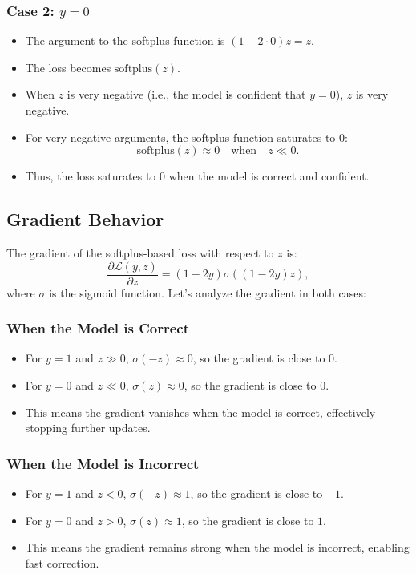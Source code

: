 \begin{notechapter}
\subsubsection{Case 2: \( y = 0 \)}
\begin{itemize}
    \item The argument to the softplus function is \( (1 - 2 \cdot 0)z = z \).
    \item The loss becomes \( \text{softplus}(z) \).
    \item When \( z \) is very negative (i.e., the model is confident that \( y = 0 \)), \( z \) is very negative.
    \item For very negative arguments, the softplus function saturates to 0:
          \[
          \text{softplus}(z) \approx 0 \quad \text{when} \quad z \ll 0.
          \]
    \item Thus, the loss saturates to 0 when the model is correct and confident.
\end{itemize}

\subsection{Gradient Behavior}
The gradient of the softplus-based loss with respect to \( z \) is:
\[
\frac{\partial \mathcal{L}(y, z)}{\partial z} = (1 - 2y) \sigma((1 - 2y)z),
\]
where \( \sigma \) is the sigmoid function. Let’s analyze the gradient in both cases:

\subsubsection{When the Model is Correct}
\begin{itemize}
    \item For \( y = 1 \) and \( z \gg 0 \), \( \sigma(-z) \approx 0 \), so the gradient is close to 0.
    \item For \( y = 0 \) and \( z \ll 0 \), \( \sigma(z) \approx 0 \), so the gradient is close to 0.
    \item This means the gradient vanishes when the model is correct, effectively stopping further updates.
\end{itemize}

\subsubsection{When the Model is Incorrect}
\begin{itemize}
    \item For \( y = 1 \) and \( z < 0 \), \( \sigma(-z) \approx 1 \), so the gradient is close to \(-1\).
    \item For \( y = 0 \) and \( z > 0 \), \( \sigma(z) \approx 1 \), so the gradient is close to \(1\).
    \item This means the gradient remains strong when the model is incorrect, enabling fast correction.
\end{itemize}


\end{notechapter}
